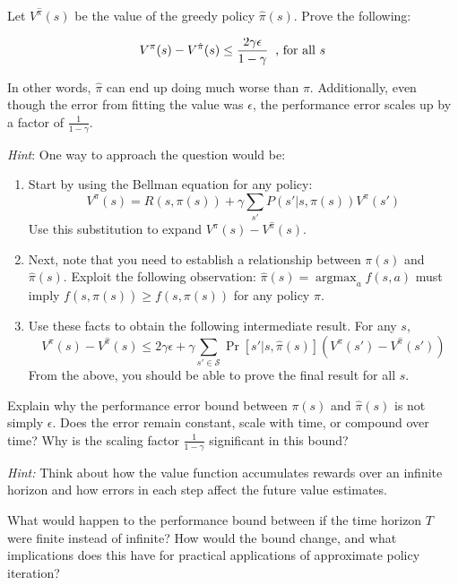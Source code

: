 \documentclass[11pt]{article}
\DeclareMathOperator*{\argmax}{argmax}
\begin{document}
 \noindent Let $V^{\hat \pi}(s)$ be the value of the greedy policy $\hat \pi(s)$. Prove the following:

$$V^{\pi}(s) -V^{\hat \pi}(s) \leq  \frac{2\gamma \epsilon}{1-\gamma} \text{\;\;, for all $s$}$$

\noindent In other words, $\hat{\pi}$ can end up doing much worse than $\pi$. Additionally, even though the error from fitting the value was $\epsilon$, the performance error scales up by a factor of $\frac{1}{1-\gamma}$. 

\noindent \textit{Hint}:
One way to approach the question would be:
\begin{enumerate}
    \item Start by using the Bellman equation for any policy:
$$V^{\pi}(s) = R(s,\pi(s)) + \gamma \sum_{s'} P(s'|s,\pi(s)) V^{\pi}(s')$$ 
Use this substitution to expand $V^{\pi}(s) -V^{\hat \pi}(s)$.
\item Next, note that you need to establish a relationship between $\pi(s)$ and $\hat \pi(s)$. Exploit the following observation: $\hat \pi(s) = \argmax_a f(s,a) $ must imply $f(s,\hat \pi(s))  \geq f(s,\pi(s))$ for any policy $\pi$.
\item Use these facts to obtain the following intermediate result. For any $s$,
$$V^{\pi}(s) -V^{\hat \pi}(s) \leq 2\gamma \epsilon + \gamma\sum_{s' \in \mathcal S} \Pr[s' | s, \hat \pi(s)](V^\pi(s') - V^{\hat \pi}(s'))$$
From the above, you should be able to prove the final result for all $s$.
\end{enumerate}

 \noindent Explain why the performance error bound between $\pi(s)$ and $\hat \pi(s)$ is not simply $\epsilon$. Does the error remain constant, scale with time, or compound over time? Why is the scaling factor $\frac{1}{1-\gamma}$ significant in this bound?
\newline

\noindent \textit{Hint:}
Think about how the value function accumulates rewards over an infinite horizon and how errors in each step affect the future value estimates.
\newline

 \noindent What would happen to the performance bound between if the time horizon $T$ were finite instead of infinite? How would the bound change, and what implications does this have for practical applications of approximate policy iteration?
\end{document}
